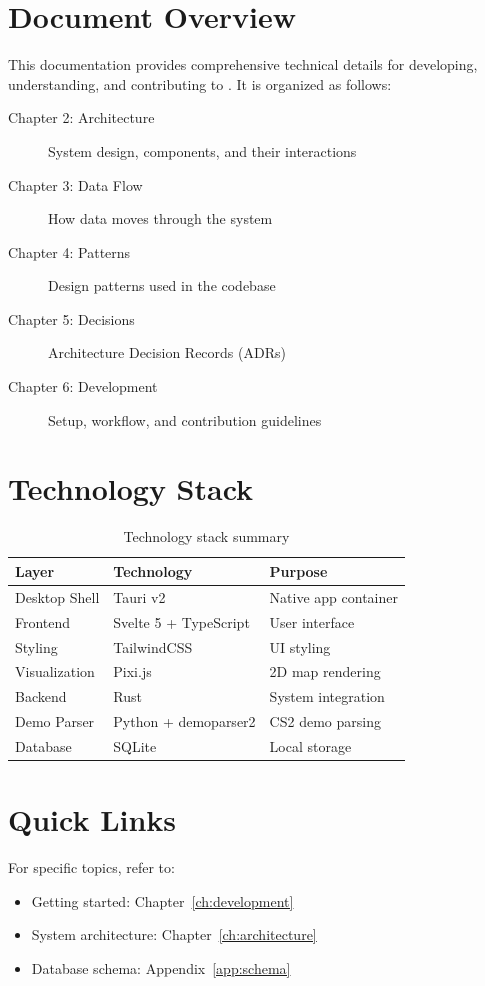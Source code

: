 \section{Document Overview}

This documentation provides comprehensive technical details for developing, understanding, and contributing to \outof{}. It is organized as follows:

\begin{description}
    \item[Chapter 2: Architecture] System design, components, and their interactions
    \item[Chapter 3: Data Flow] How data moves through the system
    \item[Chapter 4: Patterns] Design patterns used in the codebase
    \item[Chapter 5: Decisions] Architecture Decision Records (ADRs)
    \item[Chapter 6: Development] Setup, workflow, and contribution guidelines
\end{description}

\section{Technology Stack}

\begin{table}[h]
    \centering
    \begin{tabular}{@{}lll@{}}
        \toprule
        \textbf{Layer} & \textbf{Technology} & \textbf{Purpose} \\
        \midrule
        Desktop Shell & Tauri v2 & Native app container \\
        Frontend & Svelte 5 + TypeScript & User interface \\
        Styling & TailwindCSS & UI styling \\
        Visualization & Pixi.js & 2D map rendering \\
        Backend & Rust & System integration \\
        Demo Parser & Python + demoparser2 & CS2 demo parsing \\
        Database & SQLite & Local storage \\
        \bottomrule
    \end{tabular}
    \caption{Technology stack summary}
    \label{tab:tech-stack}
\end{table}

\section{Quick Links}

For specific topics, refer to:

\begin{itemize}
    \item Getting started: Chapter~\ref{ch:development}
    \item System architecture: Chapter~\ref{ch:architecture}
    \item Database schema: Appendix~\ref{app:schema}
\end{itemize}
